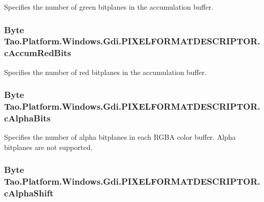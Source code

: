Specifies the number of green bitplanes in the accumulation buffer. 

\hypertarget{struct_tao_1_1_platform_1_1_windows_1_1_gdi_1_1_p_i_x_e_l_f_o_r_m_a_t_d_e_s_c_r_i_p_t_o_r_ab4cf46554fac9447711cfbdfb302e45f}{
\subsubsection[{cAccumRedBits}]{\setlength{\rightskip}{0pt plus 5cm}Byte {\bf Tao.Platform.Windows.Gdi.PIXELFORMATDESCRIPTOR.cAccumRedBits}}}
\label{struct_tao_1_1_platform_1_1_windows_1_1_gdi_1_1_p_i_x_e_l_f_o_r_m_a_t_d_e_s_c_r_i_p_t_o_r_ab4cf46554fac9447711cfbdfb302e45f}


Specifies the number of red bitplanes in the accumulation buffer. 

\hypertarget{struct_tao_1_1_platform_1_1_windows_1_1_gdi_1_1_p_i_x_e_l_f_o_r_m_a_t_d_e_s_c_r_i_p_t_o_r_acd4c882b125ec4272cf913f6f634e2ed}{
\subsubsection[{cAlphaBits}]{\setlength{\rightskip}{0pt plus 5cm}Byte {\bf Tao.Platform.Windows.Gdi.PIXELFORMATDESCRIPTOR.cAlphaBits}}}
\label{struct_tao_1_1_platform_1_1_windows_1_1_gdi_1_1_p_i_x_e_l_f_o_r_m_a_t_d_e_s_c_r_i_p_t_o_r_acd4c882b125ec4272cf913f6f634e2ed}


Specifies the number of alpha bitplanes in each RGBA color buffer. Alpha bitplanes are not supported. 

\hypertarget{struct_tao_1_1_platform_1_1_windows_1_1_gdi_1_1_p_i_x_e_l_f_o_r_m_a_t_d_e_s_c_r_i_p_t_o_r_a8ca4af8bb308e33de59a7004667c7b26}{
\subsubsection[{cAlphaShift}]{\setlength{\rightskip}{0pt plus 5cm}Byte {\bf Tao.Platform.Windows.Gdi.PIXELFORMATDESCRIPTOR.cAlphaShift}}}
\label{struct_tao_1_1_platform_1_1_windows_1_1_gdi_1_1_p_i_x_e_l_f_o_r_m_a_t_d_e_s_c_r_i_p_t_o_r_a8ca4af8bb308e33de59a7004667c7b26}


